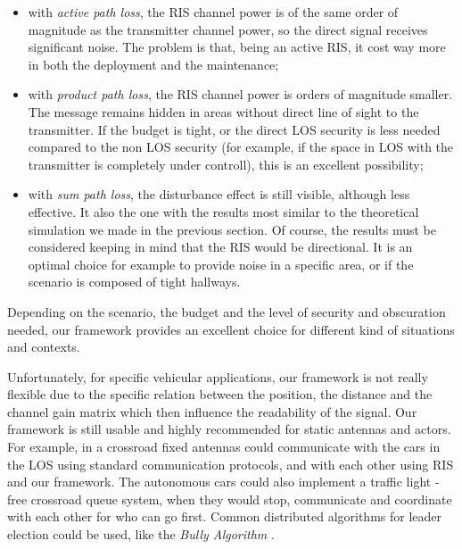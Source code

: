 \begin{itemize}
  \item with \textit{active path loss}, the RIS channel power is of the same order of magnitude as the transmitter channel power, so the direct signal receives significant noise. The problem is that, being an active RIS, it cost way more in both the deployment and the maintenance;
  \item with \textit{product path loss}, the RIS channel power is orders of magnitude smaller. The message remains hidden in areas without direct line of sight to the transmitter. If the budget is tight, or the direct LOS security is less needed compared to the non LOS security (for example, if the space in LOS with the transmitter is completely under controll), this is an excellent possibility;
  \item with \textit{sum path loss}, the disturbance effect is still visible, although less effective. It also the one with the results most similar to the theoretical simulation we made in the previous section. Of course, the results must be considered keeping in mind that the RIS would be directional. It is an optimal choice for example to provide noise in a specific area, or if the scenario is composed of tight hallways.
\end{itemize}

Depending on the scenario, the budget and the level of security and obscuration needed, our framework provides an excellent choice for different kind of situations and contexts.

Unfortunately, for specific vehicular applications, our framework is not really flexible due to the specific relation between the position, the distance and the channel gain matrix which then influence the readability of the signal. Our framework is still usable and highly recommended for static antennas and actors. For example, in a crossroad fixed antennas could communicate with the cars in the LOS using standard communication protocols, and with each other using RIS and our framework. The autonomous cars could also implement a traffic light - free crossroad queue system, when they would stop, communicate and coordinate with each other for who can go first. Common distributed algorithms for leader election could be used, like the \textit{Bully Algorithm} \cite{Bully_algorithm}.

